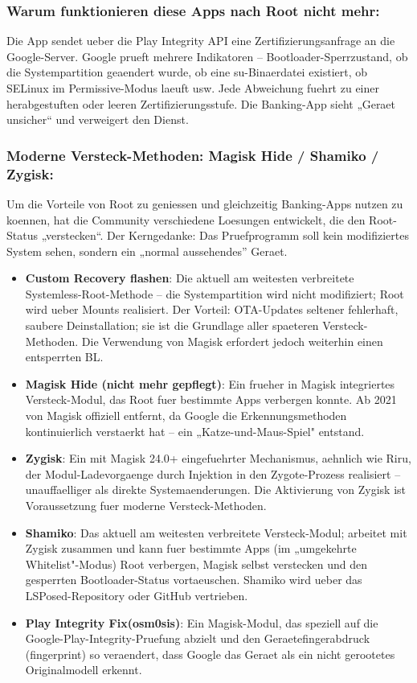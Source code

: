 \subsubsection*{Warum funktionieren diese Apps nach Root nicht mehr:}

Die App sendet ueber die Play Integrity API eine Zertifizierungsanfrage an die Google-Server. Google prueft mehrere Indikatoren – Bootloader-Sperrzustand, ob die Systempartition geaendert wurde, ob eine su-Binaerdatei existiert, ob SELinux im Permissive-Modus laeuft usw. Jede Abweichung fuehrt zu einer herabgestuften oder leeren Zertifizierungsstufe. Die Banking-App sieht „Geraet unsicher“ und verweigert den Dienst.

\subsubsection*{Moderne Versteck-Methoden: Magisk Hide / Shamiko / Zygisk:}

Um die Vorteile von Root zu geniessen und gleichzeitig Banking-Apps nutzen zu koennen, hat die Community verschiedene Loesungen entwickelt, die den Root-Status „verstecken“. Der Kerngedanke: Das Pruefprogramm soll kein modifiziertes System sehen, sondern ein „normal aussehendes” Geraet.

\begin{itemize}
  \item \textbf{Custom Recovery flashen}: Die aktuell am weitesten verbreitete Systemless-Root-Methode – die Systempartition wird nicht modifiziert; Root wird ueber Mounts realisiert. Der Vorteil: OTA-Updates seltener fehlerhaft, saubere Deinstallation; sie ist die Grundlage aller spaeteren Versteck-Methoden. Die Verwendung von Magisk erfordert jedoch weiterhin einen entsperrten BL.
  \item \textbf{Magisk Hide (nicht mehr gepflegt)}: Ein frueher in Magisk integriertes Versteck-Modul, das Root fuer bestimmte Apps verbergen konnte. Ab 2021 von Magisk offiziell entfernt, da Google die Erkennungsmethoden kontinuierlich verstaerkt hat – ein „Katze-und-Maus-Spiel" entstand.
  \item \textbf{Zygisk}: Ein mit Magisk 24.0+ eingefuehrter Mechanismus, aehnlich wie Riru, der Modul-Ladevorgaenge durch Injektion in den Zygote-Prozess realisiert – unauffaelliger als direkte Systemaenderungen. Die Aktivierung von Zygisk ist Voraussetzung fuer moderne Versteck-Methoden.
  \item \textbf{Shamiko}: Das aktuell am weitesten verbreitete Versteck-Modul; arbeitet mit Zygisk zusammen und kann fuer bestimmte Apps (im „umgekehrte Whitelist"-Modus) Root verbergen, Magisk selbst verstecken und den gesperrten Bootloader-Status vortaeuschen. Shamiko wird ueber das LSPosed-Repository oder GitHub vertrieben.
  \item \textbf{Play Integrity Fix(osm0sis)}: Ein Magisk-Modul, das speziell auf die Google-Play-Integrity-Pruefung abzielt und den Geraetefingerabdruck (fingerprint) so veraendert, dass Google das Geraet als ein nicht gerootetes Originalmodell erkennt.
\end{itemize}

